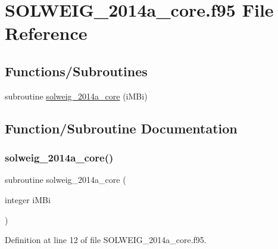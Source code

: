 \hypertarget{_s_o_l_w_e_i_g__2014a__core_8f95}{}\section{S\+O\+L\+W\+E\+I\+G\+\_\+2014a\+\_\+core.\+f95 File Reference}
\label{_s_o_l_w_e_i_g__2014a__core_8f95}
\subsection*{Functions/\+Subroutines}
\begin{DoxyCompactItemize}
\item 
subroutine \hyperlink{_s_o_l_w_e_i_g__2014a__core_8f95_a16c0a3ea3be2afe58b9d3308aa479d8f}{solweig\+\_\+2014a\+\_\+core} (i\+M\+Bi)
\end{DoxyCompactItemize}


\subsection{Function/\+Subroutine Documentation}
\mbox{\label{_s_o_l_w_e_i_g__2014a__core_8f95_a16c0a3ea3be2afe58b9d3308aa479d8f}} 
\subsubsection{\texorpdfstring{solweig\+\_\+2014a\+\_\+core()}{solweig\_2014a\_core()}}
{\footnotesize\ttfamily subroutine solweig\+\_\+2014a\+\_\+core (\begin{DoxyParamCaption}\item[{integer}]{i\+M\+Bi }\end{DoxyParamCaption})}



Definition at line 12 of file S\+O\+L\+W\+E\+I\+G\+\_\+2014a\+\_\+core.\+f95.

